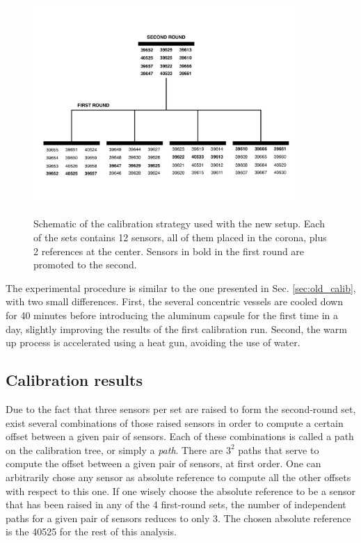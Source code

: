 \label{sec:newCalibrationStrategy}
\begin{figure}[htbp]
\centering
{\includegraphics[width=0.9\textwidth]{images/figure_16.pdf}}
\caption{Schematic of the calibration strategy used with the new setup. Each of the sets contains 12 sensors, all of them placed in the corona, plus 2 references at the center. Sensors in bold in the first round are promoted to the second.}
\label{fig:newCalibrationStrategy}
\end{figure}

The experimental procedure is similar to the one presented in Sec. \ref{sec:old_calib}, with two small differences. First, the several concentric vessels are cooled down for 40 minutes before introducing the aluminum capsule for the first time in a day, slightly improving the results of the first calibration run. Second, the warm up process is accelerated using a heat gun, avoiding the use of water.

\subsection{Calibration results}
\label{sec:new_calib_results}

Due to the fact that three sensors per set are raised to form the second-round set, exist several combinations of those raised sensors in order to compute a certain offset between a given pair of sensors. Each of these combinations is called a path on the calibration tree, or simply a \textit{path}. There are $3^2$ paths that serve to compute the offset between a given pair of sensors, at first order. One can arbitrarily chose any sensor as absolute reference to compute all the other offsets with respect to this one. If one wisely choose the absolute reference to be a sensor that has been raised in any of the 4 first-round sets, the number of independent paths for a given pair of sensors reduces to only 3. The chosen absolute reference is the 40525 for the rest of this analysis.

